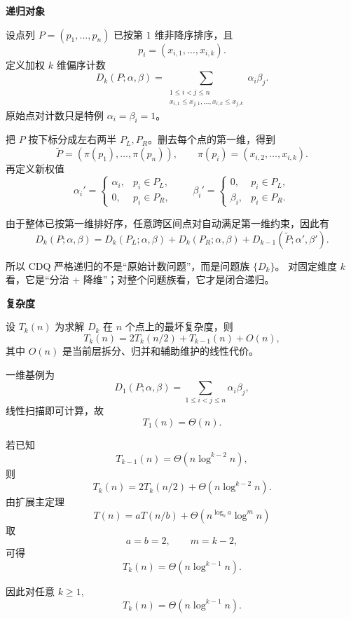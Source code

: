 \textbf{递归对象}

设点列 \(P=(p_1,\dots,p_n)\) 已按第 \(1\) 维非降序排序，且
\[
p_i=(x_{i,1},\dots,x_{i,k}).
\]
定义加权 \(k\) 维偏序计数
\[
D_k(P;\alpha,\beta)
=
\sum_{\substack{1\le i<j\le n\\x_{i,1}\le x_{j,1},\dots,x_{i,k}\le x_{j,k}}}
\alpha_i\beta_j.
\]
原始点对计数只是特例 \(\alpha_i=\beta_i=1\)。

把 \(P\) 按下标分成左右两半 \(P_L,P_R\)。删去每个点的第一维，得到
\[
\widetilde P=(\pi(p_1),\dots,\pi(p_n)),\qquad \pi(p_i)=(x_{i,2},\dots,x_{i,k}).
\]
再定义新权值
\[
\alpha_i'=
\begin{cases}
\alpha_i,& p_i\in P_L,\\
0,& p_i\in P_R,
\end{cases}
\qquad
\beta_i'=
\begin{cases}
0,& p_i\in P_L,\\
\beta_i,& p_i\in P_R.
\end{cases}
\]

由于整体已按第一维排好序，任意跨区间点对自动满足第一维约束，因此有
\[
D_k(P;\alpha,\beta)
=
D_k(P_L;\alpha,\beta)
+
D_k(P_R;\alpha,\beta)
+
D_{k-1}(\widetilde P;\alpha',\beta').
\]

所以 CDQ 严格递归的不是“原始计数问题”，而是问题族 \(\{D_k\}\)。
对固定维度 \(k\) 看，它是“分治 + 降维”；对整个问题族看，它才是闭合递归。


\textbf{复杂度}

设 \(T_k(n)\) 为求解 \(D_k\) 在 \(n\) 个点上的最坏复杂度，则
\[
T_k(n)=2T_k(n/2)+T_{k-1}(n)+O(n),
\]
其中 \(O(n)\) 是当前层拆分、归并和辅助维护的线性代价。

一维基例为
\[
D_1(P;\alpha,\beta)=\sum_{1\le i<j\le n}\alpha_i\beta_j,
\]
线性扫描即可计算，故
\[
T_1(n)=\Theta(n).
\]

若已知
\[
T_{k-1}(n)=\Theta(n\log^{k-2}n),
\]
则
\[
T_k(n)=2T_k(n/2)+\Theta(n\log^{k-2}n).
\]
由扩展主定理
\[
T(n)=aT(n/b)+\Theta(n^{\log_b a}\log^m n)
\]
取
\[
a=b=2,\qquad m=k-2,
\]
可得
\[
T_k(n)=\Theta(n\log^{k-1}n).
\]

因此对任意 \(k\ge 1\),
\[
T_k(n)=\Theta(n\log^{k-1}n).
\]

